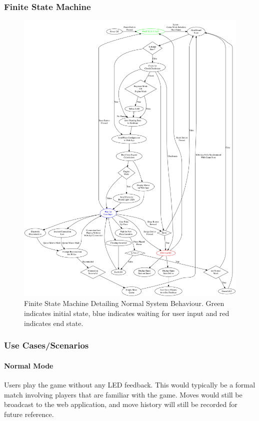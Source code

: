 \documentclass[12pt]{article}
\begin{document}
{\subsubsection{Finite State Machine}{
\begin{figure}[H]
    \begin{center}
      \includegraphics[scale=0.30]{chess-connect-FSM.pdf}
      \caption{Finite State Machine Detailing Normal System Behaviour. Green indicates initial state, blue indicates waiting for user input and red indicates end state.}
      \label{Fig_FSM} 
    \end{center}
  \end{figure}
}

\subsubsection{Use Cases/Scenarios}{
    
    \paragraph{Normal Mode}{
        Users play the game without any LED feedback. This would typically be a formal match involving players that are familiar with the game. Moves would still be broadcast to the
        web application, and move history will still be recorded for future reference.
    }
        
}}
\end{document}
